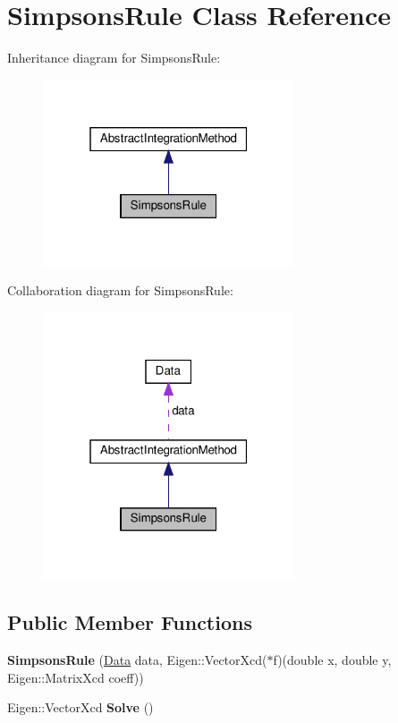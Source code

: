 \hypertarget{classSimpsonsRule}{}\section{Simpsons\+Rule Class Reference}
\label{classSimpsonsRule}


Inheritance diagram for Simpsons\+Rule\+:
\nopagebreak
\begin{figure}[H]
\begin{center}
\leavevmode
\includegraphics[width=211pt]{classSimpsonsRule__inherit__graph}
\end{center}
\end{figure}


Collaboration diagram for Simpsons\+Rule\+:
\nopagebreak
\begin{figure}[H]
\begin{center}
\leavevmode
\includegraphics[width=211pt]{classSimpsonsRule__coll__graph}
\end{center}
\end{figure}
\subsection*{Public Member Functions}
\begin{DoxyCompactItemize}
\item 
\mbox{\label{classSimpsonsRule_af880433d19d6041cdedb081b542a195b}} 
{\bfseries Simpsons\+Rule} (\hyperlink{structData}{Data} data, Eigen\+::\+Vector\+Xcd($\ast$f)(double x, double y, Eigen\+::\+Matrix\+Xcd coeff))
\item 
\mbox{\label{classSimpsonsRule_a9925b07e44be9fc1644d3cbeb742078c}} 
Eigen\+::\+Vector\+Xcd {\bfseries Solve} ()
\end{DoxyCompactItemize}
